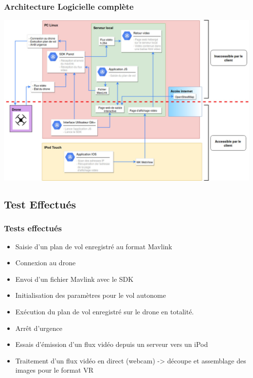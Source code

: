 \documentclass{beamer}
\begin{document}

	\begin{frame}
		\begin{center}
		\frametitle{Architecture Logicielle complète}
       
        \includegraphics[scale=0.3]{Architecture_logicielle_v2.jpg}
		\end{center}
	\end{frame}
	
	
	
	\begin{frame}
		\section{Test Effectués}
		\begin{center}
		\frametitle{Tests effectués}
           	\begin{itemize}
           	    \item Saisie d'un plan de vol enregistré au format Mavlink
                \item Connexion au drone
                \item Envoi d'un fichier Mavlink avec le SDK
                \item Initialisation des paramètres pour le vol autonome
                \item Exécution du plan de vol enregistré sur le drone en totalité.
                 \item Arrêt d'urgence
                \item Essais d'émission d'un flux vidéo depuis un serveur vers un iPod
                \item Traitement d'un flux vidéo en direct (webcam) -> découpe et assemblage des images pour le format VR 
            \end{itemize}
		\end{center}
	\end{frame}
\end{document}

